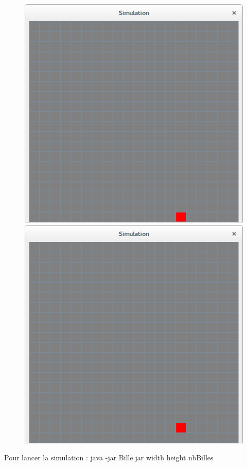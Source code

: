 \documentclass[a4paper,12pt]{report}
\begin{document}
\begin{figure}[!ht]
	\center
	\includegraphics[scale=0.3]{./bille1.png}
	\includegraphics[scale=0.3]{./bille2.png}
\end{figure}
\noindent Pour lancer la simulation : java -jar Bille.jar width height nbBilles
\newpage
\end{document}
